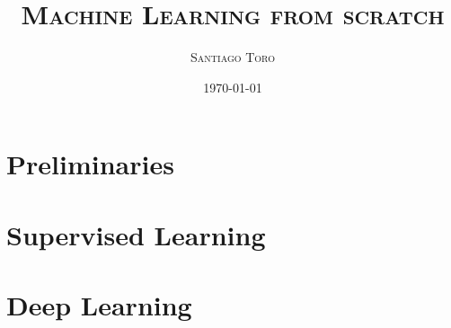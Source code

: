 \documentclass[leqno,dvipsnames,11pt]{article}
\title{\Large \textbf{ \textsc{Machine Learning from scratch}}}
\author{\textsc{Santiago Toro}}
\date{\normalsize \today}
\begin{document}
	
\maketitle

\begin{abstract}
	\lipsum[1]
\end{abstract}
	
\setcounter{tocdepth}{4}
\setcounter{secnumdepth}{4}
\tableofcontents
\cleardoublepage	


	\part{Preliminaries}
	
	
	
	\cleardoublepage
	\part{Supervised Learning}
	
		
	
	\cleardoublepage
	\part{Deep Learning}\label{part:deep_learning}
	
	
	
	

%	
%	
%	
%	
%	
%	
%	
	
	\printbibliography
\end{document}
